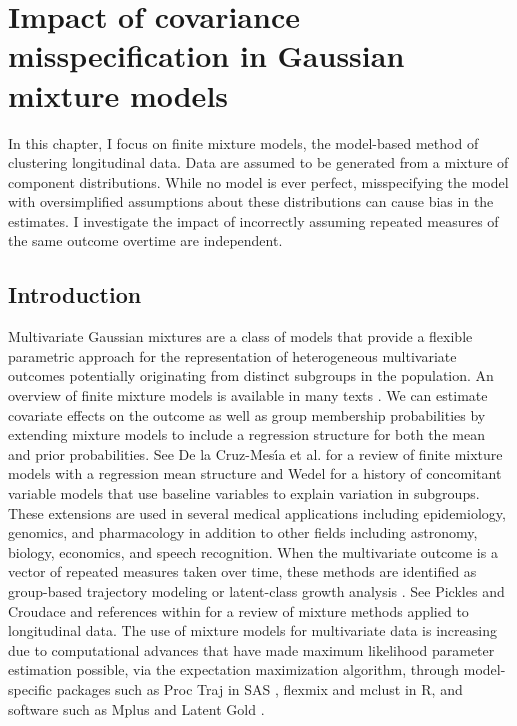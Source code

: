 \chapter{Impact of covariance misspecification in Gaussian mixture models}
In this chapter, I focus on finite mixture models, the model-based method of clustering longitudinal data. Data are assumed to be generated from a mixture of component distributions. While no model is ever perfect, misspecifying the model with oversimplified assumptions about these distributions can cause bias in the estimates. I investigate the impact of incorrectly assuming repeated measures of the same outcome overtime are independent.
\section{Introduction}
Multivariate Gaussian mixtures are a class of models that provide a flexible parametric approach for the representation of heterogeneous multivariate outcomes potentially originating from distinct subgroups in the population. An overview of finite mixture models is available in many texts \cite{everitt1981,titterington1985,mclachlan1988,mclachlan2000,fruhwirth2006}. We can estimate covariate effects on the outcome as well as group membership probabilities by extending mixture models to include a regression structure for both the mean and prior probabilities. See De la Cruz-Mes\'{\i}a et al. \cite{cruzmesia2008} for a review of finite mixture models with a regression mean structure and Wedel \cite{wedel2002} for a history of concomitant variable models that use baseline variables to explain variation in subgroups. These extensions are used in several medical applications  \cite{pranab2011} including epidemiology, genomics, and pharmacology in addition to other fields including astronomy, biology, economics, and speech recognition. When the multivariate outcome is a vector of repeated measures taken over time, these methods are identified as group-based trajectory modeling \cite{nagin1999,nagin2005} or latent-class growth analysis \cite{muthen2000, muthen2001}. See Pickles and Croudace \cite{pickles2010} and references within for a review of mixture methods applied to longitudinal data. The use of mixture models for multivariate data is increasing due to computational advances that have made maximum likelihood parameter estimation possible, via the expectation maximization algorithm, through model-specific packages such as Proc Traj in SAS \cite{jones2001}, flexmix  \cite{leisch2004} and mclust \cite{fraley1999} in R, and software such as Mplus \cite{muthen2010} and Latent Gold \cite{vermunt2005}.

